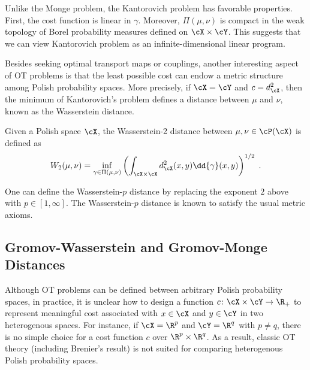 \documentclass[11pt]{article}
\begin{document}
Unlike the Monge problem, the Kantorovich problem has favorable properties. First, the cost function is linear in $\gamma$. Moreover, $\Pi(\mu, \nu)$ is compact in the weak topology of Borel probability measures defined on $\cX \times \cY$. This suggests that we can view Kantorovich problem as an infinite-dimensional linear program.

Besides seeking optimal transport maps or couplings, another interesting aspect of OT problems is that the least possible cost can endow a metric structure among Polish probability spaces. More precisely, if $\cX = \cY$ and $c = d_{\cX}^2$, then the minimum of Kantorovich's problem defines a distance between $\mu$ and $\nu$, known as the Wasserstein distance.

\begin{definition}
	Given a Polish space $\cX$, the Wasserstein-2 distance between $\mu, \nu \in \cP(\cX)$ is defined as
	\begin{equation*}
		W_2(\mu, \nu) = \inf_{\gamma \in \Pi(\mu, \nu)} \left(\int_{\cX \times \cX} d_{\cX}^2(x, y) \dd{\gamma}(x, y)\right)^{1/2}\;.
	\end{equation*}
\end{definition}
\begin{remark}
	One can define the Wasserstein-$p$ distance by replacing the exponent $2$ above with $p \in [1, \infty]$. The Wasserstein-$p$ distance is known to satisfy the usual metric axioms.
\end{remark}


\subsection{Gromov-Wasserstein and Gromov-Monge Distances}
Although OT problems can be defined between arbitrary Polish probability spaces, in practice, it is unclear how to design a function $c \colon \cX \times \cY \to \R_+$ to represent meaningful cost associated with $x \in \cX$ and $y \in \cY$ in two heterogenous spaces.
For instance, if $\cX = \R^p$ and $\cY = \R^q$ with $p \neq q$, there is no simple choice for a cost function $c$ over $\R^p \times \R^q$. As a result, classic OT theory (including Brenier's result) is not suited for comparing heterogenous Polish probability spaces.
\end{document}
